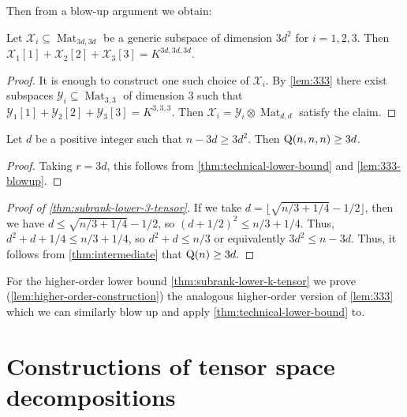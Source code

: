 \documentclass[11pt]{article}
\theoremstyle{definition}
\theoremstyle{remark}
\newcommand{\gensubrank}{{\rm Q}}
\newcommand{\Mat}{\operatorname{Mat}}
\begin{document}
Then from a blow-up argument we obtain:

\begin{lemma}\label{lem:333-blowup}
Let $\mathcal{X}_i \subseteq \Mat_{3d,3d}$ be a generic subspace of dimension $3d^2$ for $i=1,2,3$. Then $\mathcal{X}_1[1]+\mathcal{X}_2[2]+\mathcal{X}_3[3] = K^{3d, 3d, 3d}$.
\end{lemma}
\begin{proof}
It is enough to construct one such choice of $\mathcal{X}_i$. By \autoref{lem:333} there exist subspaces $\mathcal{Y}_i \subseteq \Mat_{3,3}$ of dimension 3 such that $\mathcal{Y}_1[1]+\mathcal{Y}_2[2]+\mathcal{Y}_3[3] = K^{3,3,3}$. Then $\mathcal{X}_i = \mathcal{Y}_i \otimes \Mat_{d,d}$ satisfy the claim.
\end{proof}

\begin{theorem}\label{thm:intermediate}
Let $d$ be a positive integer such that $n-3d \geq 3d^2$. Then $\gensubrank(n,n,n) \geq 3d$.
\end{theorem}
\begin{proof}
Taking $r = 3d$, this follows from \autoref{thm:technical-lower-bound} and \autoref{lem:333-blowup}.
\end{proof}

\begin{proof}[Proof of \autoref{thm:subrank-lower-3-tensor}]
If we take $d = \lfloor \sqrt{ n/3 + 1/4}   - 1/2 \rfloor$, then we have 
$d \leq \sqrt{n/3 + 1/4} - 1/2$, so $(d+1/2)^2 \leq n/3 + 1/4$. Thus, $d^2 + d + 1/4 \leq n/3 + 1/4$, so $d^2 + d \leq n/3$ or equivalently $3d^2 \leq n-3d$. Thus, it follows from \autoref{thm:intermediate} that $\gensubrank(n) \geq 3d.$
\end{proof}

For the higher-order lower bound \autoref{thm:subrank-lower-k-tensor}
we prove (\autoref{lem:higher-order-construction}) the analogous higher-order version of \autoref{lem:333} which we can similarly blow up and apply \autoref{thm:technical-lower-bound} to.

\section{Constructions of tensor space decompositions}\label{sec:constructions}


\newcommand{\kar} {{\rm char}}
\newcommand{\R}{{\mathbb R}}
\newcommand{\Rep}{{\rm Rep}}
\newcommand{\SI}{{\rm SI}}
\newcommand{\SO}{{\rm SO}}
\newcommand{\ST}{{\rm ST}}
\newcommand{\PD} {{\rm PD}}
\newcommand{\mlt}{{\rm mlt}}
\newcommand{\Lie} {{\rm Lie}}
\end{document}
